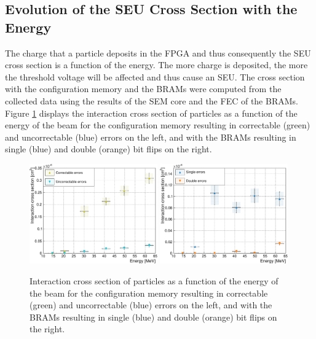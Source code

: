     \subsection{Evolution of the SEU Cross Section with the Energy}

      The charge that a particle deposits in the FPGA and thus consequently the SEU cross section is a function of the energy. The more charge is deposited, the more the threshold voltage will be affected and thus cause an SEU. The cross section with the configuration memory and the BRAMs were computed from the collected data using the results of the SEM core and the FEC of the BRAMs. Figure \ref{fig:II-6-data-seu-energy} displays the interaction cross section of particles as a function of the energy of the beam for the configuration memory resulting in correctable (green) and uncorrectable (blue) errors on the left, and with the BRAMs resulting in single (blue) and double (orange) bit flips on the right. \\

      \begin{figure}[h!]
        \centering
        \includegraphics[width=0.49\textwidth]{img/plots/cE_SEM-crop}
        \includegraphics[width=0.49\textwidth]{img/plots/cE_BRAM-crop}
        \caption{Interaction cross section of particles as a function of the energy of the beam for the configuration memory resulting in correctable (green) and uncorrectable (blue) errors on the left, and with the BRAMs resulting in single (blue) and double (orange) bit flips on the right.}
        \label{fig:II-6-data-seu-energy}
      \end{figure}


